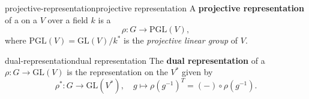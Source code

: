\begin{topic}{projective-representation}{projective representation}
    A \textbf{projective representation} of a  on a  $V$ over a field $k$ is a 
    \[ \rho : G \to \text{PGL}(V) , \]
    where $\text{PGL}(V) = \text{GL}(V) / k^*$ is the \textit{projective linear group} of $V$.
\end{topic}


\begin{topic}{dual-representation}{dual representation}
    The \textbf{dual representation} of a  $\rho : G \to \text{GL}(V)$ is the representation on the  $V^*$ given by
    \[ \rho^* : G \to \text{GL}(V^*), \quad g \mapsto \rho(g^{-1})^T = (-) \circ \rho(g^{-1}) . \]
\end{topic}
